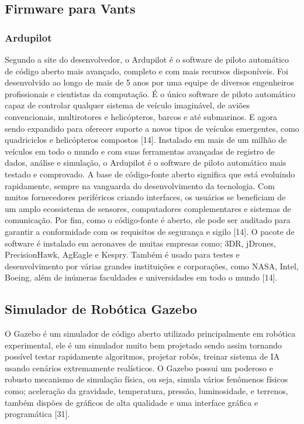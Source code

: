 \subsection{Firmware para Vants}

\subsubsection{Ardupilot}
Segundo a site do desenvolvedor, o Ardupilot é o software de piloto automático de código aberto mais avançado, completo e com mais recursos disponíveis. Foi desenvolvido ao longo de mais de 5 anos por uma equipe de diversos engenheiros profissionais e cientistas da computação. É o único software de piloto automático capaz de controlar qualquer sistema de veículo imaginável, de aviões convencionais, multirotores e helicópteros, barcos e até submarinos. E agora sendo expandido para oferecer suporte a novos tipos de veículos emergentes, como quadriciclos e helicópteros compostos [14].
Instalado em mais de um milhão de veículos em todo o mundo e com suas ferramentas avançadas de registro de dados, análise e simulação, o Ardupilot é o software de piloto automático mais testado e comprovado. A base de código-fonte aberto significa que está evoluindo rapidamente, sempre na vanguarda do desenvolvimento da tecnologia. Com muitos fornecedores periféricos criando interfaces, os usuários se beneficiam de um amplo ecossistema de sensores, computadores complementares e sistemas de comunicação. Por fim, como o código-fonte é aberto, ele pode ser auditado para garantir a conformidade com os requisitos de segurança e sigilo [14].
O pacote de software é instalado em aeronaves de muitas empresas como; 3DR, jDrones, PrecisionHawk, AgEagle e Kespry. Também é usado para testes e desenvolvimento por várias grandes instituições e corporações, como NASA, Intel, Boeing, além de inúmeras faculdades e universidades em todo o mundo [14].

\subsection{Simulador de Robótica Gazebo}
O Gazebo é um simulador de código aberto utilizado principalmente em robótica experimental, ele é um simulador muito bem projetado sendo assim tornando possível testar rapidamente algoritmos, projetar robôs, treinar sistema de IA usando cenários extremamente realísticos. O Gazebo possui um poderoso e robusto mecanismo de simulação física, ou seja, simula vários fenômenos físicos como; aceleração da gravidade, temperatura, pressão, luminosidade, e terrenos, também dispões de gráficos de alta qualidade e uma interface gráfica e programática [31]. 

